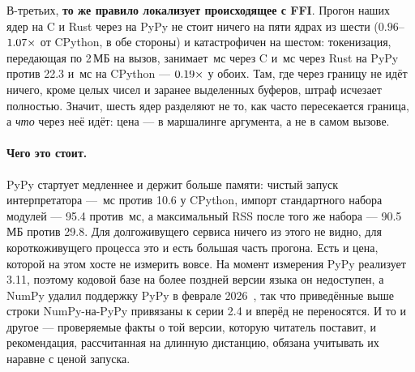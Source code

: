 В-третьих, \textbf{то же правило локализует происходящее с FFI}. Прогон наших ядер на C и Rust
через  на PyPy не стоит ничего на пяти ядрах из шести ($0.96$--$\meas{ratio:b2_branchy-314:binarytrees/rust_ctypes|b2_branchy-pypy311:binarytrees/rust_ctypes}{1.07}\times$ от CPython,
в обе стороны) и катастрофичен на шестом: токенизация, передающая по 2\,МБ  на вызов,
занимает \,мс через C и \,мс через Rust на PyPy против 22.3 и \,мс на CPython ---
$\meas{ratio:b2_branchy-314:tokenize/c_ctypes|b2_branchy-pypy311:tokenize/c_ctypes}{0.19}\times$ у обоих. Там, где через границу не идёт ничего, кроме целых чисел и заранее выделенных
буферов, штраф исчезает полностью. Значит, шесть ядер разделяют не то, как часто пересекается
граница, а \emph{что} через неё идёт: цена --- в маршалинге аргумента, а не в самом вызове.

\paragraph{Чего это стоит.} PyPy стартует медленнее и держит больше памяти: чистый запуск
интерпретатора --- \,мс против 10.6 у CPython, импорт стандартного набора модулей --- 95.4
против \,мс, а максимальный RSS после того же набора --- 90.5\,МБ против 29.8. Для
долгоживущего сервиса ничего из этого не видно, для короткоживущего процесса это и есть большая
часть прогона. Есть и цена, которой на этом хосте не измерить вовсе. На момент измерения PyPy
реализует 3.11, поэтому кодовой базе на более поздней версии языка он недоступен, а NumPy удалил
поддержку PyPy в феврале 2026~\cite{numpy-drop-pypy}, так что приведённые выше строки
NumPy-на-PyPy привязаны к серии 2.4 и вперёд не переносятся. И то и другое --- проверяемые факты о
той версии, которую читатель поставит, и рекомендация, рассчитанная на длинную дистанцию, обязана
учитывать их наравне с ценой запуска.


